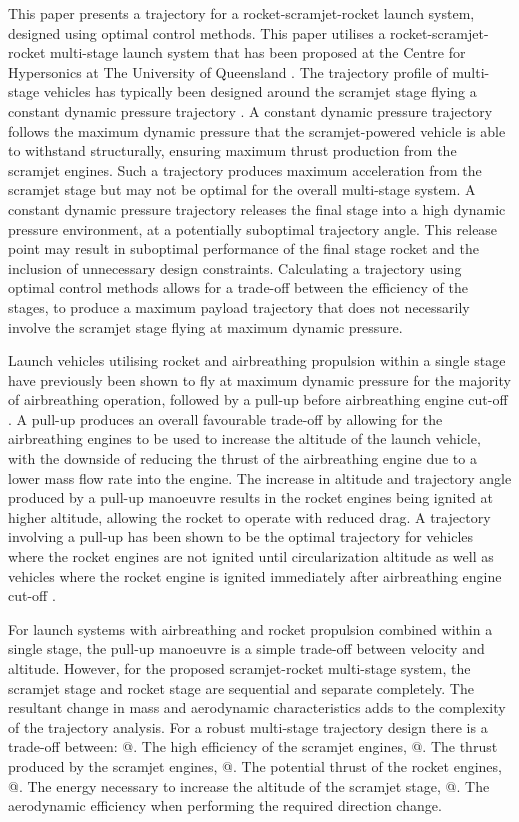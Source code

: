 \documentclass[]{aiaa-tc}
\makeatletter
\newcommand*{\rom}[1]{\expandafter\@slowromancap\romannumeral #1@}
\makeatother
\begin{document}
This paper presents a trajectory for a rocket-scramjet-rocket launch system, designed using optimal control methods. This paper utilises a rocket-scramjet-rocket multi-stage launch system that has been proposed at the Centre for Hypersonics at The University of Queensland \cite{Smart2009a}. 
The trajectory profile of multi-stage vehicles has typically been designed around the scramjet stage flying a constant dynamic pressure trajectory \cite{Kimura1999,Olds1998,Preller2015a}.
 A constant dynamic pressure trajectory follows the maximum dynamic pressure that the scramjet-powered vehicle is able to withstand structurally, ensuring maximum thrust production from the scramjet engines. 
 Such a trajectory produces maximum acceleration from the scramjet stage but may not be optimal for the overall multi-stage system. 
 A constant dynamic pressure trajectory releases the final stage into a high dynamic pressure environment, at a potentially suboptimal trajectory angle. This release point may result in suboptimal performance of the final stage rocket  and the inclusion of unnecessary design constraints. Calculating a trajectory using optimal control methods allows for a trade-off between the efficiency of the stages, to produce a maximum payload trajectory that does not necessarily involve the scramjet stage flying at maximum dynamic pressure.
 
  
 Launch vehicles utilising rocket and airbreathing propulsion within a single stage have previously been shown to fly at maximum dynamic pressure for the majority of airbreathing operation, followed by a pull-up before airbreathing engine cut-off \cite{Powell1991,Lu1993,Trefny1999}. 
A pull-up produces an overall favourable trade-off by allowing for the airbreathing engines to be used to increase the altitude of the launch vehicle, with the downside of reducing the thrust of the airbreathing engine due to a lower mass flow rate into the engine. The increase in altitude and trajectory angle produced by a pull-up manoeuvre results in the rocket engines being ignited at higher altitude, allowing the rocket to operate with reduced drag. A trajectory involving a pull-up has been shown to be the optimal trajectory for vehicles where the rocket engines are not ignited until circularization altitude \cite{Powell1991,Lu1993} as well as vehicles where the rocket engine is ignited immediately after airbreathing engine cut-off \cite{Trefny1999}.


 For launch systems with airbreathing and rocket propulsion combined within a single stage, the pull-up manoeuvre is a simple trade-off between velocity and altitude. However, for the proposed scramjet-rocket multi-stage system, the scramjet stage and rocket stage are sequential and separate completely.
 The resultant change in mass and aerodynamic characteristics adds to the complexity of the trajectory analysis.
 For a robust multi-stage trajectory design there is a trade-off between: 
 \rom{1}. The high efficiency of the scramjet engines,
\rom{2}. The thrust produced by the scramjet engines, 
\rom{3}. The potential thrust of the rocket engines,
\rom{4}. The energy necessary to increase the altitude of the scramjet stage,
\rom{5}. The aerodynamic efficiency when performing the required direction change.
\end{document}
